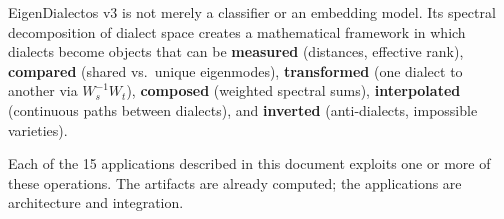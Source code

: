 \documentclass[11pt,a4paper]{article}
\begin{document}
\bigskip

EigenDialectos v3 is not merely a classifier or an embedding model.
Its spectral decomposition of dialect space creates a mathematical
framework in which dialects become objects that can be
\textbf{measured} (distances, effective rank),
\textbf{compared} (shared vs.\ unique eigenmodes),
\textbf{transformed} (one dialect to another via $W^{-1}_s W_t$),
\textbf{composed} (weighted spectral sums),
\textbf{interpolated} (continuous paths between dialects), and
\textbf{inverted} (anti-dialects, impossible varieties).

Each of the 15 applications described in this document exploits one or
more of these operations. The artifacts are already computed; the
applications are architecture and integration.
\end{document}
